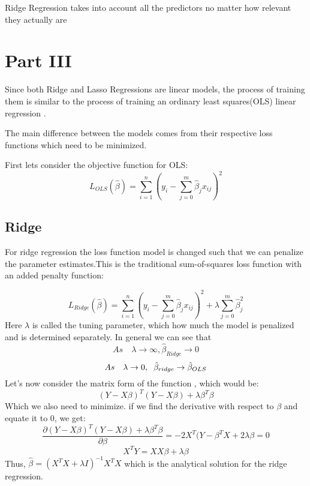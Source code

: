 \documentclass{article}
\begin{document}
Ridge Regression takes into account all the predictors no matter how relevant they actually are


\section*{Part III}

Since both Ridge and Lasso Regressions are linear models, the process of training them is similar to the process of training an ordinary least squares(OLS) linear regression .

The main difference between the models comes from their respective loss functions which need to be minimized.

First lets consider the objective function for OLS:
\begin{displaymath} 
L_{OLS}(\hat{\beta})=\sum_{i=1}^{n}{(y_i-\sum_{j=0}^{m}{\hat{\beta}_jx_{ij}})^2}
\end{displaymath}
\subsection*{Ridge}
For ridge regression the loss function model is changed such that we can penalize the parameter estimates.This is the traditional sum-of-squares loss function with an added penalty function:

\begin{displaymath} 
L_{Ridge}(\hat{\beta})=\sum_{i=1}^{n}{(y_i-\sum_{j=0}^{m}{\hat{\beta}_jx_{ij}})^2} + \lambda\sum_{j=0}^{m}{\hat{\beta}_j^2}
\end{displaymath}
Here $\lambda$ is called the tuning parameter, which how much the model is penalized and is determined separately. In general we can see that $$As\quad\lambda\rightarrow\infty,\hat{\beta}_{Ridge}\rightarrow0$$ $$As\quad\lambda \rightarrow 0, \hspace{0.2cm}  \hat\beta_{ridge} \rightarrow \hat\beta_{OLS}$$
Let's now consider the matrix form of the function , which would be:
\begin{displaymath} 
(Y-X\beta)^T (Y-X\beta)+\lambda \beta^T \beta
\end{displaymath}
Which we also need to minimize. if we find the derivative with respect to $\beta$  and equate it to 0, we get:
\begin{displaymath} 
\frac{\partial (Y-X\beta)^T (Y-X\beta)+\lambda \beta^T \beta}{\partial \beta}= -2 X^T (Y-\beta^T X+2\lambda\beta =0
\end{displaymath}
\begin{displaymath} 
X^T Y=X X\beta +\lambda\beta  
\end{displaymath}
Thus,  $ \hat{\beta}=(X^{T}X+\lambda I)^{-1}X^TX $ which is the analytical solution for the ridge regression.
\end{document}

